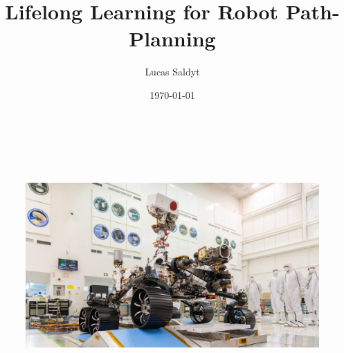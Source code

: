 \documentclass[aspectratio=169]{beamer}
\title[Lifelong Learning for Planning]{Lifelong Learning for Robot Path-Planning}
\author{Lucas Saldyt}
\institute{Arizona State University}
\date{\today}
\begin{document}
\maketitle

\begin{frame}[plain]
  \begin{figure}
  \centering
  \vspace*{-1em}
  \hspace*{-3em}
  \includegraphics[height=9.5cm,keepaspectratio]{figures/perseverance.jpg}
  \end{figure}
\end{frame}
\end{document}

